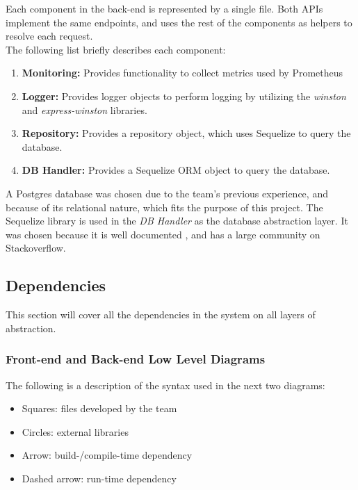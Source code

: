 \noindent
Each component in the back-end is represented by a single file. Both APIs implement the same endpoints, and uses the rest of the components as helpers to resolve each request.\\
The following list briefly describes each component:
\begin{enumerate}
    \item \textbf{Monitoring:} Provides functionality to collect metrics used by Prometheus
    \item \textbf{Logger:} Provides logger objects to perform logging by utilizing the \textit{winston} and \textit{express-winston} libraries.
    \item \textbf{Repository:} Provides a repository object, which uses Sequelize to query the database.
    \item \textbf{DB Handler:} Provides a Sequelize ORM object to query the database.
\end{enumerate}

A Postgres database was chosen due to the team's previous experience, and because of its relational nature, which fits the purpose of this project. The Sequelize library is used in the \textit{DB Handler} as the database abstraction layer. It was chosen because it is well documented \cite{sequelize}, and has a large community on Stackoverflow.

\newpage
\subsection{Dependencies}
This section will cover all the dependencies in the system on all layers of abstraction.

\subsubsection{Front-end and Back-end Low Level Diagrams}
The following is a description of the syntax used in the next two diagrams:
\begin{itemize}
    \item Squares: files developed by the team
    \item Circles: external libraries
    \item Arrow: build-/compile-time dependency
    \item Dashed arrow: run-time dependency
\end{itemize}

